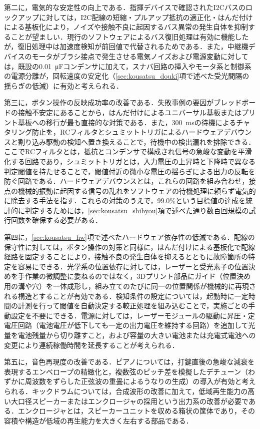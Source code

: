 第二に，電気的な安定性の向上である．指揮デバイスで確認されたI2Cバスのロックアップに対しては，I2C配線の短縮・プルアップ抵抗の適正化・はんだ付けによる基板化により，ノイズや接触不良に起因するバス異常の発生自体を抑制することが望ましい．現行のソフトウェアによるバス復旧処理は有効に機能したが，復旧処理中は加速度検知が前回値で代替されるためである．また，中継機デバイスのモータがブラシ接点で発生させる電気ノイズおよび電源変動に対しては，既設の\SI{0.01}{\micro\farad}コンデンサに加えて，スナバ回路\cite{ieice_knowledgebase}の挿入やモータ系と制御系の電源分離が，回転速度の安定化（\ref{sec:kousatsu_douki}項で述べた受光間隔の揺らぎの低減）に有効と考えられる．

第三に，ボタン操作の反映成功率の改善である．失敗事例の要因がブレッドボードの接触不安定にあることから，はんだ付けによるユニバーサル基板またはプリント基板への移行が最も直接的な対策である．また，\SI{300}{ms}の待機によるチャタリング防止を，RCフィルタとシュミットトリガによるハードウェアデバウンスと割り込み駆動の検知へ置き換えることで，待機中の検出漏れを排除できる．ここでRCフィルタとは，抵抗とコンデンサで構成され信号の急峻な変動を平滑化する回路であり，シュミットトリガとは，入力電圧の上昇時と下降時で異なる判定閾値を持たせることで，閾値付近の微小な電圧の揺らぎによる出力の反転を防ぐ回路である．ハードウェアデバウンスとは，これらの回路を組み合わせ，接点の機械的振動に起因する信号の乱れをソフトウェアの待機処理に頼らず電気的に除去する手法を指す．これらの対策のうえで，99.0\%という目標値の達成を統計的に判定するためには，\ref{sec:kousatsu_shihyou}項で述べた通り数百回規模の試行回数を確保する必要がある．

第四に，\ref{sec:kousatsu_hw}項で述べたハードウェア依存性の低減である．配線の保守性に対しては，ボタン操作の対策と同様に，はんだ付けによる基板化で配線経路を固定することにより，接触不良の発生自体を抑えるとともに故障箇所の特定を容易にできる．光学系の位置依存に対しては，レーザーと受光素子の位置決めを手作業の微調整に委ねるのではなく，3Dプリント部品にガイド（位置決め用の溝や穴）を一体成形し，組み立てのたびに同一の位置関係が機械的に再現される構造とすることが有効である．検知条件の設定については，起動時に一定時間の計測を行って閾値を自動決定する較正処理を組み込むことで，実施ごとの手動設定を不要にできる．電源に対しては，レーザーモジュールの駆動に昇圧・定電圧回路（電池電圧が低下しても一定の出力電圧を維持する回路）を追加して光量を電池残量から切り離すこと，および容量の大きい電池または充電式電池への変更により連続稼働時間を延長することが考えられる．

第五に，音色再現度の改善である．ピアノについては，打鍵直後の急峻な減衰を表現するエンベロープの精緻化と，複数弦のピッチ差を模擬したデチューン（わずかに周波数をずらした正弦波の重畳によるうなりの生成）の導入が有効と考えられる．キックドラムについては，合成波形の改善に加えて，低域再生能力の高い大口径スピーカーまたはエンクロージャの採用という出力系の改善が必要である．エンクロージャとは，スピーカーユニットを収める箱状の筐体であり，その容積や構造が低域の再生能力を大きく左右する部品である．

